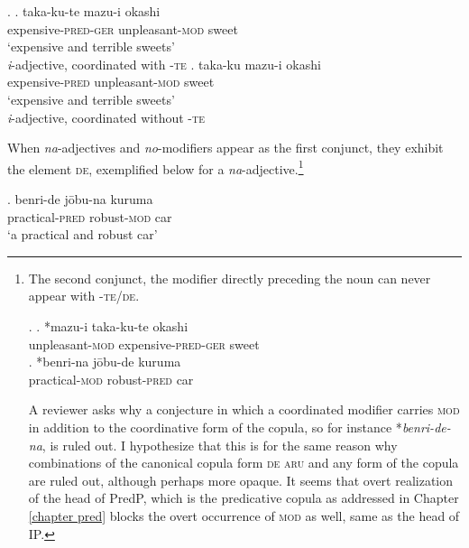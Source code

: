 \documentclass [output=book,colorlinks,citecolor=brown]{langscibook}
\begin{document}
\ex. \ag. taka-ku-te mazu-i okashi\\
expensive-\textsc{pred-ger} unpleasant-\textsc{mod} sweet\\
`expensive and terrible sweets' \\ \null \hfill \textit{i}-adjective, coordinated with -\textsc{te}
\bg. taka-ku mazu-i okashi\\
expensive-\textsc{pred} unpleasant-\textsc{mod} sweet\\
`expensive and terrible sweets' \\ \null \hfill \textit{i}-adjective, coordinated without -\textsc{te}

When \textit{na}-adjectives and \textit{no}-modifiers appear as the first conjunct, they exhibit the element \textsc{de}, exemplified below for a \textit{na}-adjective.\footnote{The second conjunct, the modifier directly preceding the noun can never appear with -\textsc{te/de}.

\par

\ex. \ag. *mazu-i taka-ku-te okashi\\
unpleasant-\textsc{mod} expensive-\textsc{pred-ger} sweet\\
\bg. *benri-na jōbu-de kuruma\\
practical-\textsc{mod} robust-\textsc{pred} car\\

\par


A reviewer asks why a conjecture in which a coordinated modifier carries \textsc{mod} in addition to the coordinative form of the copula, so for instance *\textit{benri-de-na}, is ruled out. I hypothesize that this is for the same reason why combinations of the canonical copula form \textsc{de aru} and any form of the copula are ruled out, although perhaps more opaque. It seems that overt realization of the head of PredP, which is the predicative copula as addressed in Chapter \ref{chapter pred} blocks the overt occurrence of \textsc{mod} as well, same as the head of IP.}

\exg. benri-de jōbu-na kuruma\\
practical-\textsc{pred} robust-\textsc{mod} car\\
`a practical and robust car'
\end{document}
